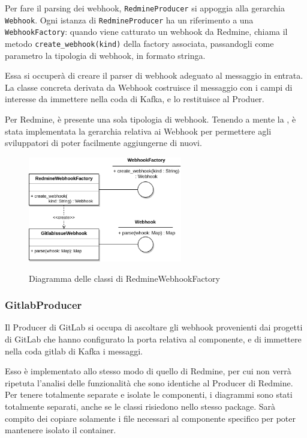 Per fare il parsing dei webhook, \texttt{RedmineProducer} si appoggia alla gerarchia \texttt{Webhook}.
Ogni istanza di \texttt{RedmineProducer} ha un riferimento a una \texttt{WebhookFactory}: quando viene
catturato un webhook da Redmine, chiama il metodo \texttt{create\_webhook(kind)} della
factory associata, passandogli come parametro la tipologia di webhook, in formato stringa.

Essa si occuperà di creare il parser di webhook adeguato al messaggio in entrata.
La classe concreta derivata da Webhook costruisce il messaggio con i campi di interesse da
immettere nella coda di Kafka, e lo restituisce al Produer.

Per Redmine, è presente una sola tipologia di webhook. Tenendo a mente la ,
è stata implementata la gerarchia relativa ai Webhook per permettere agli sviluppatori di poter facilmente
aggiungerne di nuovi.

\begin{figure}[H]
    \centering
    \includegraphics[width=0.6\textwidth]{img/Producers-RedmineWebhook.png}\\
    \caption{Diagramma delle classi di RedmineWebhookFactory}
\end{figure}



\subsubsection{GitlabProducer}
Il Producer di GitLab si occupa di ascoltare gli webhook provenienti dai progetti di GitLab
che hanno configurato la porta relativa al componente, e di immettere nella coda gitlab di
Kafka i messaggi.

Esso è implementato allo stesso modo di quello di Redmine, per cui non verrà ripetuta l'analisi delle
funzionalità che sono identiche al Producer di Redmine. Per tenere totalmente separate e isolate
le componenti, i diagrammi sono stati totalmente separati, anche se le classi risiedono nello stesso package.
Sarà compito dei  copiare solamente i file necessari al componente specifico per poter mantenere
isolato il container.


